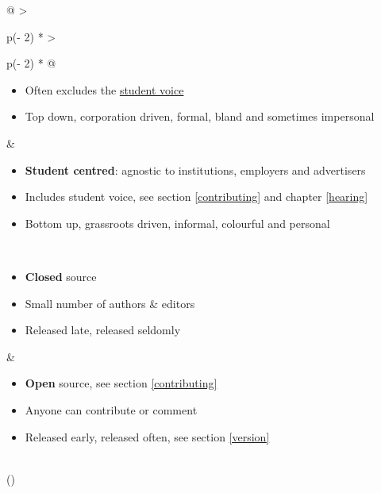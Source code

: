\documentclass[
]{book}
\providecommand{\tightlist}{%
  \setlength{\itemsep}{0pt}\setlength{\parskip}{0pt}}
\begin{document}
\begin{longtable}[]{@{}
  >{\raggedright\arraybackslash}p{(\columnwidth - 2\tabcolsep) * }
  >{\raggedright\arraybackslash}p{(\columnwidth - 2\tabcolsep) * }@{}}
\begin{minipage}[t]{\linewidth}
\begin{itemize}
  \textbf{Institution centred}: Institutionalised by Universities, employers or advertisers
\item
  Often excludes the \href{https://en.wikipedia.org/wiki/Student_voice}{student voice}
\item
  Top down, corporation driven, formal, bland and sometimes impersonal
\end{itemize}
\end{minipage} & \begin{minipage}[t]{\linewidth}\raggedright
\begin{itemize}
\tightlist
\item
  \textbf{Student centred}: agnostic to institutions, employers and advertisers
\item
  Includes student voice, see section \ref{contributing} and chapter \ref{hearing}
\item
  Bottom up, grassroots driven, informal, colourful and personal
\end{itemize}
\end{minipage} \\
\begin{minipage}[t]{\linewidth}\raggedright
\begin{itemize}
\tightlist
\item
  \textbf{Closed} source
\item
  Small number of authors \& editors
\item
  Released late, released seldomly
\end{itemize}
\end{minipage} & \begin{minipage}[t]{\linewidth}\raggedright
\begin{itemize}
\tightlist
\item
  \textbf{Open} source, see section \ref{contributing}
\item
  Anyone can contribute or comment
\item
  Released early, released often, see section \ref{version}
\end{itemize}
\end{minipage} \\
\bottomrule()
\end{longtable}
\end{document}
